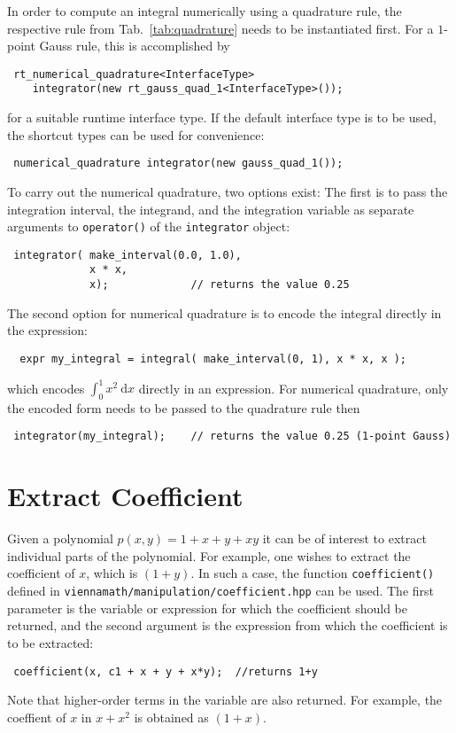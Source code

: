 In order to compute an integral numerically using a quadrature rule, the respective rule from Tab.~\ref{tab:quadrature} needs to be instantiated first.
For a $1$-point Gauss rule, this is accomplished by
\begin{lstlisting}
 rt_numerical_quadrature<InterfaceType> 
    integrator(new rt_gauss_quad_1<InterfaceType>());
\end{lstlisting}
for a suitable runtime interface type. If the default interface type is to be used, the shortcut types can be used for convenience:
\begin{lstlisting}
 numerical_quadrature integrator(new gauss_quad_1());
\end{lstlisting}
To carry out the numerical quadrature, two options exist: The first is to pass the integration interval, the integrand, and
the integration variable as separate arguments to \lstinline|operator()| of the \lstinline|integrator| object:
\begin{lstlisting}
 integrator( make_interval(0.0, 1.0),
             x * x,
             x);             // returns the value 0.25
\end{lstlisting}
The second option for numerical quadrature is to encode the integral directly in the expression:
\begin{lstlisting}
  expr my_integral = integral( make_interval(0, 1), x * x, x );
\end{lstlisting}
which encodes $\int_0^1 x^2 \: \mathrm{d} x$ directly in an expression. For numerical quadrature, only the encoded form needs to be passed to the quadrature
rule then
\begin{lstlisting}
 integrator(my_integral);    // returns the value 0.25 (1-point Gauss)
\end{lstlisting}



 \section{Extract Coefficient}
Given a polynomial $p(x,y) = 1 + x + y + xy$ it can be of interest to extract individual parts of the polynomial.
For example, one wishes to extract the coefficient of $x$, which is $(1+y)$. In such a case, 
the function \lstinline|coefficient()| defined in \lstinline|viennamath/manipulation/coefficient.hpp| can be used.
The first parameter is the variable or expression for which the coefficient should be returned, and the second argument is the expression from which the
coefficient is to be extracted:
\begin{lstlisting}
 coefficient(x, c1 + x + y + x*y);  //returns 1+y
\end{lstlisting}
Note that higher-order terms in the variable are also returned. For example, the coeffient of $x$ in $x+x^2$ is obtained as $(1+x)$.

